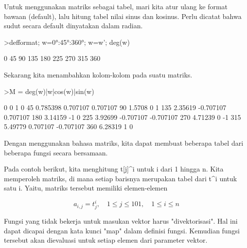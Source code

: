 \documentclass{article}
\newenvironment{eulernotebook}{\par}{\par}
\newenvironment{eulercomment}{\par\medskip}{\par\medskip}
\newenvironment{eulerformula}{}{}
\begin{document}
\begin{eulernotebook}
\begin{eulercomment}
\begin{eulercomment}
\begin{eulercomment}
\begin{eulercomment}
\begin{eulercomment}
\begin{eulercomment}
\begin{eulercomment}
Untuk menggunakan matriks sebagai tabel, mari kita atur ulang ke
format bawaan (default), lalu hitung tabel nilai sinus dan kosinus.
Perlu dicatat bahwa sudut secara default dinyatakan dalam radian.
\end{eulercomment}
\begin{eulerprompt}
>defformat; w=0°:45°:360°; w=w'; deg(w)
\end{eulerprompt}
\begin{euleroutput}
              0 
             45 
             90 
            135 
            180 
            225 
            270 
            315 
            360 
\end{euleroutput}
\begin{eulercomment}
Sekarang kita menambahkan kolom-kolom pada suatu matriks.
\end{eulercomment}
\begin{eulerprompt}
>M = deg(w)|w|cos(w)|sin(w)
\end{eulerprompt}
\begin{euleroutput}
              0             0             1             0 
             45      0.785398      0.707107      0.707107 
             90        1.5708             0             1 
            135       2.35619     -0.707107      0.707107 
            180       3.14159            -1             0 
            225       3.92699     -0.707107     -0.707107 
            270       4.71239             0            -1 
            315       5.49779      0.707107     -0.707107 
            360       6.28319             1             0 
\end{euleroutput}
\begin{eulercomment}
Dengan menggunakan bahasa matriks, kita dapat membuat beberapa tabel
dari beberapa fungsi secara bersamaan.

Pada contoh berikut, kita menghitung t[j]\textasciicircum{}i untuk i dari 1 hingga n.
Kita memperoleh matriks, di mana setiap barisnya merupakan tabel dari
t\textasciicircum{}i untuk satu i. Yaitu, matriks tersebut memiliki elemen-elemen
\end{eulercomment}
\begin{eulerformula}
\[
a_{i,j} = t_j^i, \quad 1 \le j \le 101, \quad 1 \le i \le n
\]
\end{eulerformula}
\begin{eulercomment}
Fungsi yang tidak bekerja untuk masukan vektor harus "divektorisasi".
Hal ini dapat dicapai dengan kata kunci "map" dalam definisi fungsi.
Kemudian fungsi tersebut akan dievaluasi untuk setiap elemen dari
parameter vektor.


\end{eulercomment}
\end{eulercomment}
\end{eulercomment}
\end{eulercomment}
\end{eulercomment}
\end{eulercomment}
\end{eulercomment}
\end{eulernotebook}
\end{document}
